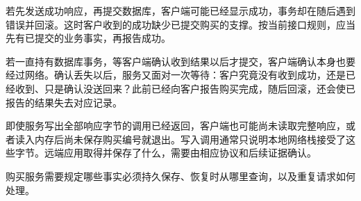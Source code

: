若先发送成功响应，再提交数据库，客户端可能已经显示成功，事务却在随后遇到错误并回滚。这时客户收到的成功缺少已提交购买的支撑。按当前接口规则，应当先有已提交的业务事实，再报告成功。

若一直持有数据库事务，等客户端确认收到结果以后才提交，客户端确认本身也要经过网络。确认丢失以后，服务又面对一次等待：客户究竟没有收到成功，还是已经收到、只是确认没送回来？此前已经向客户报告购买完成，随后回滚，还会使已报告的结果失去对应记录。



即使服务写出全部响应字节的调用已经返回，客户端也可能尚未读取完整响应，或者读入内存后尚未保存购买编号就退出。写入调用通常只说明本地网络栈接受了这些字节。远端应用取得并保存了什么，需要由相应协议和后续证据确认。

购买服务需要规定哪些事实必须持久保存、恢复时从哪里查询，以及重复请求如何处理。
\FloatBarrier
